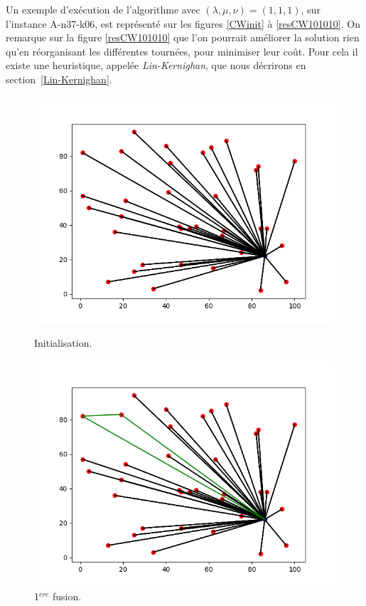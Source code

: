 \documentclass[a4paper,11pt]{article}%
\begin{document}
Un exemple d'exécution de l'algorithme avec $(\lambda, \mu, \nu) = (1,1,1)$, sur l'instance A-n37-k06, est représenté sur les figures \ref{CWinit} à \ref{resCW101010}. On remarque sur la figure \ref{resCW101010} que l'on pourrait améliorer la solution rien qu'en réorganisant les différentes tournées, pour minimiser leur coût. Pour cela il existe une heuristique, appelée \emph{Lin-Kernighan}, que nous décrirons en section~\ref{Lin-Kernighan}.


\begin{figure}
    \begin{minipage}[c]{.46\linewidth}
        \centering
  	\includegraphics[scale=0.4]{CWinit.png}
  	\caption{Initialisation.}
	\label{CWinit}
    \end{minipage}
    \hfill%
    \begin{minipage}[c]{.46\linewidth}
        \centering
	\includegraphics[scale=0.4]{CW1.png}
	\caption{1$^{ere}$ fusion.}
 	\label{CW1}
    \end{minipage}


\end{figure}
\end{document}
